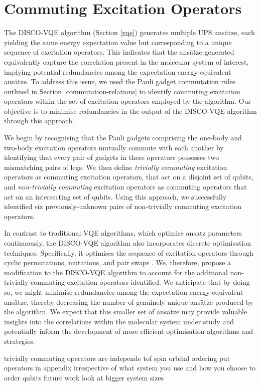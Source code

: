 \section{Commuting Excitation Operators}%
\label{operator-commutations}

The DISCO-VQE algorithm (Section \ref{vqe}) generates multiple UPS ansätze, each yielding the same energy expectation value but corresponding to a unique sequence of excitation operators. This indicates that the ansätze generated equivalently capture the correlation present in the molecular system of interest, implying potential redundancies among the expectation energy-equivalent ansätze. To address this issue, we used the Pauli gadget commutation rules outlined in Section \ref{commutation-relations} to identify commuting excitation operators within the set of excitation operators employed by the algorithm. Our objective is to minimise redundancies in the output of the DISCO-VQE algorithm through this approach.

We begin by recognising that the Pauli gadgets comprising the one-body and two-body excitation operators mutually commute with each another by identifying that every pair of gadgets in these operators possesses two mismatching pairs of legs. We then define \textit{trivially commuting} excitation operators as commuting excitation operators, that act on a disjoint set of qubits, and \textit{non-trivially commuting} excitation operators as commuting operators that act on an intersecting set of qubits. Using this approach, we successfully identified six previously-unknown pairs of non-trivially commuting excitation operators.

In contrast to traditional VQE algorithms, which optimise ansatz parameters continuously, the DISCO-VQE algorithm also incorporates discrete optimisation techniques. Specifically, it optimises the sequence of excitation operators through cyclic permutations, mutations, and pair swaps \cite{Burton2023}. We, therefore, propose a modification to the DISCO-VQE algorithm to account for the additional non-trivially commuting excitation operators identified. We anticipate that by doing so, we might minimise redundancies among the expectation energy-equivalent ansätze, thereby decreasing the number of genuinely unique ansätze produced by the algorithm. We expect that this smaller set of ansätze may provide valuable insights into the correlations within the molecular system under study and potentially inform the development of more efficient optimisation algorithms and strategies.




trivially commuting operators are independe tof spin orbital ordering
put operators in appendix
irrespective of what system you use and how you choose to order qubits
future work look at bigger system sizes
